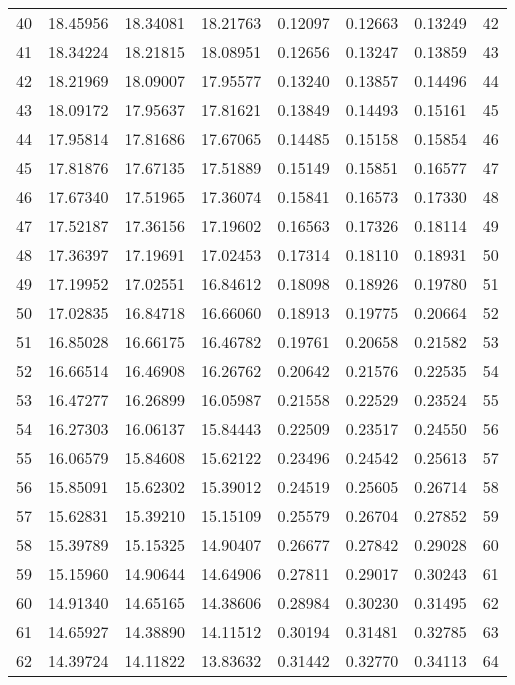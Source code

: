 \documentclass[12pt]{article}
\begin{document}
\begin{longtable}{rrrrrrrr}
  40 & 18.45956 & 18.34081 & 18.21763 & 0.12097 & 0.12663 & 0.13249 & 42 \\ 
  41 & 18.34224 & 18.21815 & 18.08951 & 0.12656 & 0.13247 & 0.13859 & 43 \\ 
  42 & 18.21969 & 18.09007 & 17.95577 & 0.13240 & 0.13857 & 0.14496 & 44 \\ 
  43 & 18.09172 & 17.95637 & 17.81621 & 0.13849 & 0.14493 & 0.15161 & 45 \\ 
  44 & 17.95814 & 17.81686 & 17.67065 & 0.14485 & 0.15158 & 0.15854 & 46 \\ 
  45 & 17.81876 & 17.67135 & 17.51889 & 0.15149 & 0.15851 & 0.16577 & 47 \\ 
  46 & 17.67340 & 17.51965 & 17.36074 & 0.15841 & 0.16573 & 0.17330 & 48 \\ 
  47 & 17.52187 & 17.36156 & 17.19602 & 0.16563 & 0.17326 & 0.18114 & 49 \\ 
  48 & 17.36397 & 17.19691 & 17.02453 & 0.17314 & 0.18110 & 0.18931 & 50 \\ 
  49 & 17.19952 & 17.02551 & 16.84612 & 0.18098 & 0.18926 & 0.19780 & 51 \\ 
  50 & 17.02835 & 16.84718 & 16.66060 & 0.18913 & 0.19775 & 0.20664 & 52 \\ 
  51 & 16.85028 & 16.66175 & 16.46782 & 0.19761 & 0.20658 & 0.21582 & 53 \\ 
  52 & 16.66514 & 16.46908 & 16.26762 & 0.20642 & 0.21576 & 0.22535 & 54 \\ 
  53 & 16.47277 & 16.26899 & 16.05987 & 0.21558 & 0.22529 & 0.23524 & 55 \\ 
  54 & 16.27303 & 16.06137 & 15.84443 & 0.22509 & 0.23517 & 0.24550 & 56 \\ 
  55 & 16.06579 & 15.84608 & 15.62122 & 0.23496 & 0.24542 & 0.25613 & 57 \\ 
  56 & 15.85091 & 15.62302 & 15.39012 & 0.24519 & 0.25605 & 0.26714 & 58 \\ 
  57 & 15.62831 & 15.39210 & 15.15109 & 0.25579 & 0.26704 & 0.27852 & 59 \\ 
  58 & 15.39789 & 15.15325 & 14.90407 & 0.26677 & 0.27842 & 0.29028 & 60 \\ 
  59 & 15.15960 & 14.90644 & 14.64906 & 0.27811 & 0.29017 & 0.30243 & 61 \\ 
  60 & 14.91340 & 14.65165 & 14.38606 & 0.28984 & 0.30230 & 0.31495 & 62 \\ 
  61 & 14.65927 & 14.38890 & 14.11512 & 0.30194 & 0.31481 & 0.32785 & 63 \\ 
  62 & 14.39724 & 14.11822 & 13.83632 & 0.31442 & 0.32770 & 0.34113 & 64 \\ 

\end{longtable}
\end{document}
